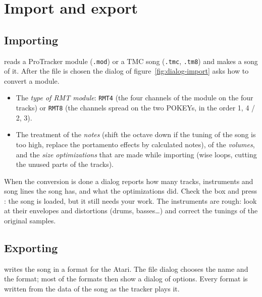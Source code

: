\chapter{Import and export}\label{ch:importexport}

\section{Importing}

 reads a ProTracker module (\texttt{.mod}) or a TMC song (\texttt{.tmc}, \texttt{.tm8}) and
makes a song of it. After the file is chosen the dialog of figure~\ref{fig:dialog-import} asks how to convert a module.


\begin{itemize}
  \item The \emph{type of RMT module}: \texttt{RMT4} (the four channels of the module on the four tracks) or \texttt{RMT8}
        (the channels spread on the two POKEYs, in the order 1, 4 / 2, 3).
  \item The treatment of the \emph{notes} (shift the octave down if the tuning of the song is too high, replace the portamento
        effects by calculated notes), of the \emph{volumes}, and the \emph{size optimizations} that are made while importing (wise loops, cutting
        the unused parts of the tracks).
\end{itemize}

When the conversion is done a dialog reports how many tracks, instruments and song lines the song has, and what the optimizations did.
Check the box and press : the song is loaded, but it still needs your work. The instruments are rough: look at their envelopes and
distortions (drums, basses\ldots) and correct the tunings of the original samples.


\section{Exporting}

 writes the song in a format for the Atari. The file dialog chooses the name and the format; most of the
formats then show a dialog of options. Every format is written from the data of the song as the tracker plays it.

